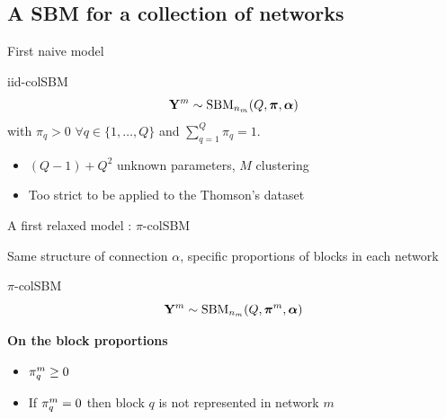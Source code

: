 \documentclass[compress,10pt]{beamer}
\begin{document}
\subsection{A SBM for a collection of networks}
 
\begin{frame}{First naive model}

\begin{block}{iid-colSBM}
 \begin{equation*}\label{mod:iid}
\mathbf{Y}^m \sim \mbox{SBM}_{n_m}(Q,\boldsymbol{\pi}, \boldsymbol{\alpha})
\end{equation*}
with $\pi_{q} >0 $ $\forall q  \in  \{1,\dots, Q\}$ and $\sum_{q  = 1}^Q \pi_{q} = 1$.
\end{block}
\begin{itemize}
\item  $(Q-1)+Q^2$ unknown parameters, $M$ clustering 
\item  Too strict to be applied to the Thomson's dataset
\end{itemize}


\end{frame}





\begin{frame}{A first relaxed model : $\pi$-colSBM}

Same structure of connection  $\alpha$, specific proportions of blocks in each network
 
 
\begin{block}{$\pi$-colSBM}
 \begin{equation*}\label{mod:iid}
\mathbf{Y}^m \sim \mbox{SBM}_{n_m}(Q, \boldsymbol{\pi}^m, \boldsymbol{\alpha})
\end{equation*}
 
\end{block}

\textbf{On the block proportions}
\begin{itemize}
\item  $\pi^{m}_q \geq 0$
\item If $\pi^{m}_q=0$ then  block $q$ is not represented in network $m$
\end{itemize}
\end{frame}
\end{document}
